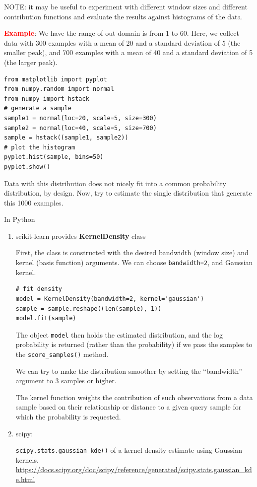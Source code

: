 NOTE: it may be useful to experiment with different window sizes and different
contribution functions and evaluate the results against histograms of the data.

\textcolor{red}{\bf Example}: We have the range of out domain is from 1 to 60.
Here, we collect data with 300 examples with a mean of 20 and a standard
deviation of 5 (the smaller peak), and 700 examples with a mean of 40 and a
standard deviation of 5 (the larger peak).
\begin{lstlisting}
from matplotlib import pyplot
from numpy.random import normal
from numpy import hstack
# generate a sample
sample1 = normal(loc=20, scale=5, size=300)
sample2 = normal(loc=40, scale=5, size=700)
sample = hstack((sample1, sample2))
# plot the histogram
pyplot.hist(sample, bins=50)
pyplot.show()
\end{lstlisting}

Data with this distribution does not nicely fit into a common probability distribution, by design.
Now, try to estimate the single distribution that generate this 1000 examples.

In Python
\begin{enumerate}
  \item scikit-learn provides {\bf KernelDensity } class
  
  First, the class is constructed with the desired bandwidth (window size) and
  kernel (basis function) arguments.
  We can choose \verb!bandwidth=2!, and Gaussian kernel.
  \begin{lstlisting}
# fit density
model = KernelDensity(bandwidth=2, kernel='gaussian')
sample = sample.reshape((len(sample), 1))
model.fit(sample)
  \end{lstlisting}
  
The object \verb!model! then holds the estimated distribution, and the log
probability is returned (rather than the probability) if we pass the samples to
the \verb!score_samples()! method.


We can try to make the distribution smoother by setting the “bandwidth” argument
to 3 samples or higher.

The kernel function weights the contribution of such observations from a data
sample based on their relationship or distance to a given query sample for which
the probability is requested.


  
  \item scipy:

\verb!scipy.stats.gaussian_kde()!  of a kernel-density estimate using Gaussian kernels.  
\url{https://docs.scipy.org/doc/scipy/reference/generated/scipy.stats.gaussian_kde.html}


\end{enumerate}

